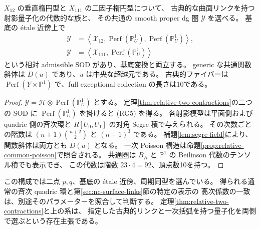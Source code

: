 \begin{corollary}\label{cor:relative-common-threefold}
$X_{12}$ の垂直楕円型と $X_{111}$ の二因子楕円型について、
古典的な曲面リンクを持つ射影量子化の代数的な族と、
その共通の smooth proper dg 圏 $\mathcal Y$ を選べる。
基底の \'etale 近傍上で
\[
 \begin{aligned}
 \mathcal Y
 &=\left\langle
 \mathcal X_{12},\operatorname{Perf}(\mathbb P^1_U),
 \operatorname{Perf}(\mathbb P^1_U)\right\rangle,\\
 \mathcal Y
 &=\left\langle
 \mathcal X_{111},\operatorname{Perf}(\mathbb P^1_U)\right\rangle
 \end{aligned}
 \tag{RG5}
\]
という相対 admissible SOD があり、基底変換と両立する。
generic な共通関数斜体は $D(u)$ であり、$u$ は中央な超越元である。
古典的ファイバーは
$\operatorname{Perf}(Y\times\mathbb P^1)$ で、full exceptional collection の長さは10である。
\end{corollary}
\begin{proof}
$\mathcal Y=\mathcal H\otimes\operatorname{Perf}(\mathbb P^1_U)$ とする。
定理\ref{thm:relative-two-contractions}の二つの SOD に
$\operatorname{Perf}(\mathbb P^1_U)$ を掛けると (RG5) を得る。
各射影模型は平面側および quadric 側の斉次環と
$R[U_0,U_1]$ の対角 Segre 積で与えられる。
その次数ごとの階数は $(n+1)\binom{n+2}{2}$ と $(n+1)^3$ である。
補題\ref{lem:segre-field}により、関数斜体は両方とも $D(u)$ となる。
一次 Poisson 構造は命題\ref{prop:relative-common-poisson}で照合される。
共通圏は $B_R$ と $\mathbb P^1$ の Beilinson 代数のテンソル積でも表示でき、
この代数は階数 $23\cdot4=92$、頂点数10を持つ。
\end{proof}

この構成では二点 $p,q$、基底の \'etale 近傍、周期同型を選んでいる。
得られる通常の斉次 quadric 環と第\ref{sec:nc-surface-links}節の特定の表示の
高次係数の一致は、別途そのパラメーターを照合して判断する。
定理\ref{thm:relative-two-contractions}と上の系は、
指定した古典的リンクと一次括弧を持つ量子化を両側で選ぶという存在主張である。
